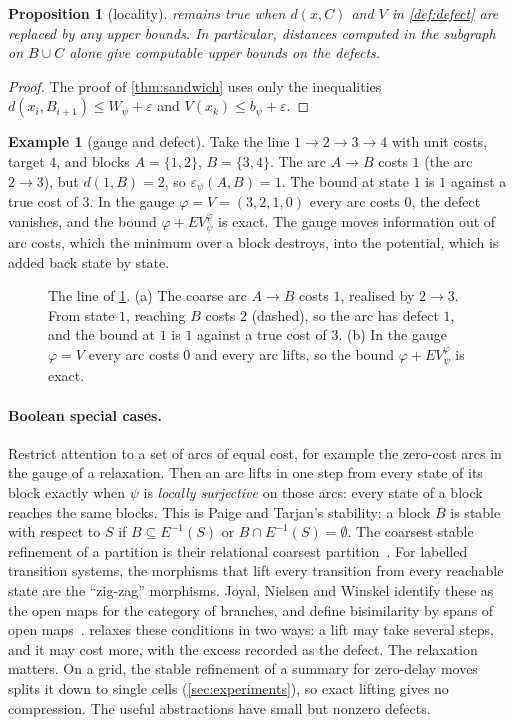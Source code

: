 \documentclass[11pt]{article}
\newtheorem{proposition}[theorem]{Proposition}
\theoremstyle{definition}
\newtheorem{example}[theorem]{Example}
\theoremstyle{remark}
\newcommand{\eps}{\varepsilon}
\newcommand{\dd}{d}
\begin{document}
\begin{proposition}[locality]\label{prop:local}
 remains true when $\dd(x,C)$ and $V$ in \cref{def:defect} are
replaced by any upper bounds. In particular, distances computed in the subgraph
on $B \cup C$ alone give computable upper bounds on the defects.
\end{proposition}
\begin{proof}
The proof of \cref{thm:sandwich} uses only the inequalities
$\dd(x_i,B_{i+1}) \le W_\psi + \eps$ and $V(x_k) \le b_\psi + \eps$.
\end{proof}

\begin{example}[gauge and defect]\label{ex:line}
Take the line $1 \to 2 \to 3 \to 4$ with unit costs, target $4$, and blocks
$A = \{1,2\}$, $B = \{3,4\}$. The arc $A \to B$ costs $1$ (the arc $2 \to 3$), but
$\dd(1, B) = 2$, so $\eps_\psi(A,B) = 1$. The bound at state $1$ is $1$ against a
true cost of $3$. In the gauge $\varphi = V = (3,2,1,0)$ every arc costs $0$, the
defect vanishes, and the bound $\varphi + E V^\varphi_\psi$ is exact. The gauge
moves information out of arc costs, which the minimum over a block destroys, into
the potential, which is added back state by state.
\end{example}

\begin{figure}[t]
\centering

\caption{The line of \cref{ex:line}. (a) The coarse arc $A \to B$ costs $1$,
realised by $2 \to 3$. From state $1$, reaching $B$ costs $2$ (dashed), so the arc
has defect $1$, and the bound at $1$ is $1$ against a true cost of $3$. (b) In the
gauge $\varphi = V$ every arc costs $0$ and every arc lifts, so the bound
$\varphi + E V^\varphi_\psi$ is exact.}
\label{fig:line}
\end{figure}

\paragraph{Boolean special cases.}
Restrict attention to a set of arcs of equal cost, for example the zero-cost arcs
in the gauge of a relaxation. Then an arc lifts in one step from every state of
its block exactly when $\psi$ is \emph{locally surjective} on those arcs: every
state of a block reaches the same blocks. This is Paige and Tarjan's stability: a block $B$ is stable with respect to $S$
if $B \subseteq E^{-1}(S)$ or $B \cap E^{-1}(S) = \emptyset$. The coarsest stable
refinement of a partition is their relational coarsest
partition~\cite{paige1987}. For labelled transition systems, the morphisms that
lift every transition from every reachable state are the ``zig-zag'' morphisms.
Joyal, Nielsen and Winskel identify these as the open maps for the category of
branches, and define bisimilarity by spans of open maps~\cite{joyal1996}.  relaxes these conditions in two
ways: a lift may take several steps, and it may cost more, with the excess
recorded as the defect. The relaxation matters. On a grid, the stable refinement of
a summary for zero-delay moves splits it down to single cells
(\cref{sec:experiments}), so exact lifting gives no compression. The useful
abstractions have small but nonzero defects.
\end{document}
